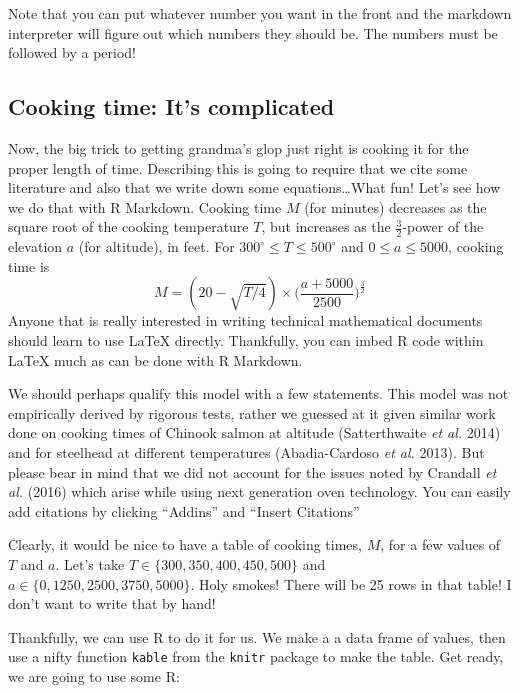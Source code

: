 \documentclass[
]{article}
\begin{document}
Note that you can put whatever number you want in the front and the
markdown interpreter will figure out which numbers they should be. The
numbers must be followed by a period!

\hypertarget{cooking-time-its-complicated}{%
\subsection{Cooking time: It's
complicated}\label{cooking-time-its-complicated}}

Now, the big trick to getting grandma's glop just right is cooking it
for the proper length of time. Describing this is going to require that
we cite some literature and also that we write down some
equations\ldots What fun! Let's see how we do that with R Markdown.
Cooking time \(M\) (for minutes) decreases as the square root of the
cooking temperature \(T\), but increases as the \(\frac{3}{2}\)-power of
the elevation \(a\) (for altitude), in feet. For
\(300^\circ \leq T \leq 500^\circ\) and \(0\leq a \leq 5000\), cooking
time is \[
M = (20 - \sqrt{T/4}) \times \biggl(\frac{a+5000}{2500}\biggr)^\frac{3}{2}
\] Anyone that is really interested in writing technical mathematical
documents should learn to use LaTeX directly. Thankfully, you can imbed
R code within LaTeX much as can be done with R Markdown.

We should perhaps qualify this model with a few statements. This model
was not empirically derived by rigorous tests, rather we guessed at it
given similar work done on cooking times of Chinook salmon at altitude
(Satterthwaite \emph{et al.} 2014) and for steelhead at different
temperatures (Abadia-Cardoso \emph{et al.} 2013). But please bear in
mind that we did not account for the issues noted by Crandall \emph{et
al.} (2016) which arise while using next generation oven technology. You
can easily add citations by clicking ``Addins'' and ``Insert Citations''

Clearly, it would be nice to have a table of cooking times, \(M\), for a
few values of \(T\) and \(a\). Let's take
\(T\in\{300, 350, 400, 450, 500\}\) and
\(a\in\{0, 1250, 2500, 3750, 5000\}\). Holy smokes! There will be 25
rows in that table! I don't want to write that by hand!

Thankfully, we can use R to do it for us. We make a a data frame of
values, then use a nifty function \texttt{kable} from the \texttt{knitr}
package to make the table. Get ready, we are going to use some R:
\end{document}
